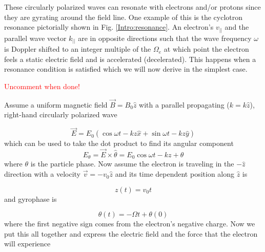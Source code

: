 These circularly polarized waves can resonate with electrons and/or protons since they are gyrating around the field line. One example of this is the cyclotron resonance pictorially shown in Fig. \ref{Intro:resonance}. An electron's $v_{||}$ and the parallel wave vector $k_{||}$ are in opposite directions such that the wave frequency $\omega$ is Doppler shifted to an integer multiple of the $\Omega_e$ at which point the electron feels a static electric field and is accelerated (decelerated). This happens when a resonance condition is satisfied which we will now derive in the simplest case.

\textcolor{red}{Uncomment when done!}
\iffalse
\begin{figure}
\texttt{[image: 1\_resonance.png]}
\caption{The trajectories of an electron and a right-hand circularly polarized wave when a cyclotron resonance can occur. The electron's $v_{||}$ and the wave's $k_{||}$ are in opposite directions such that the wave's frequency is Doppler shifted to a integer multiple of the electron cyclotron frequency. Figure from \citep{Tsurutani1997}.}
\label{Intro:resonance}
\end{figure}
\fi

Assume a uniform magnetic field $\vec{B} = B_0 \hat{z}$ with a parallel propagating ($k = k\hat{z}$), right-hand circularly polarized wave

\begin{equation}
\vec{E} = E_0 (\cos{\omega t - kz}\hat{x} + \sin{\omega t - kz}\hat{y}) 
\end{equation} which can be used to take the dot product to find its angular component
\begin{equation}
E_\theta = \vec{E} \times \hat{\theta} = E_0 \cos{\omega t - kz + \theta}
\end{equation} where $\theta$ is the particle phase. Now assume the electron is traveling in the $-\hat{z}$ direction with a velocity $\vec{v} = -v_0 \hat{z}$ and its time dependent position along $\hat{z}$ is

\begin{equation}
z(t) = v_0 t
\end{equation} and gyrophase is

\begin{equation}
\theta(t) = -\Omega t + \theta(0)
\end{equation} where the first negative sign comes from the electron's negative charge. Now we put this all together and express the electric field and the force that the electron will experience

